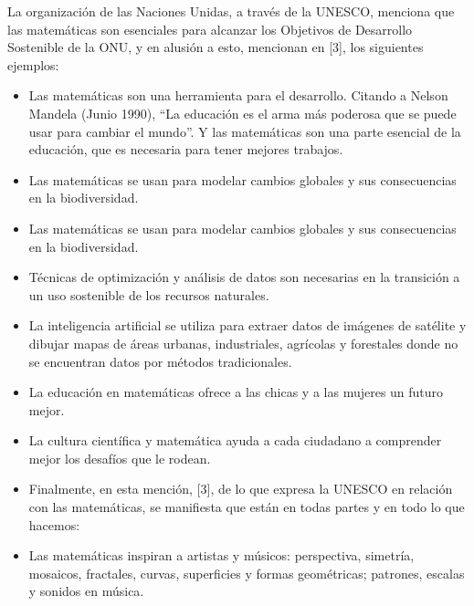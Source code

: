 La organización de las Naciones Unidas, a través de la UNESCO, menciona que las matemáticas son esenciales para alcanzar los Objetivos de Desarrollo Sostenible de la ONU, y en alusión a esto, mencionan en [3], los siguientes ejemplos: 

\begin{itemize}
    
     \color{blue} \item \color{black} Las matemáticas son una herramienta para el desarrollo. Citando a Nelson Mandela (Junio 1990), “La educación es el arma más poderosa que se puede usar para cambiar el mundo”. Y las matemáticas son una parte esencial de la educación, que es necesaria para tener mejores trabajos. 
    
    \color{blue} \item \color{black} Las matemáticas se usan para modelar cambios globales y sus consecuencias en la biodiversidad.
    
    \color{blue} \item \color{black} Las matemáticas se usan para modelar cambios globales y sus consecuencias en la biodiversidad.
    
    \color{blue} \item \color{black} Técnicas de optimización y análisis de datos son necesarias en la transición a un uso sostenible de los recursos naturales.
    
    \color{blue} \item \color{black} La inteligencia artificial se utiliza para extraer datos de imágenes de satélite y dibujar mapas de áreas urbanas, industriales, agrícolas y forestales donde no se encuentran datos por métodos tradicionales.   

    \color{blue} \item \color{black} La educación en matemáticas ofrece a las chicas y a las mujeres un futuro mejor.   

    \color{blue} \item \color{black} La cultura científica y matemática ayuda a cada ciudadano a comprender mejor los desafíos que le rodean. 
    
     \color{blue} \item \color{black} Finalmente, en esta mención, [3], de lo que expresa la UNESCO en relación con las matemáticas, se manifiesta que están en todas partes y en todo lo que hacemos: 
    
     \color{blue} \item \color{black} Las matemáticas inspiran a artistas y músicos: perspectiva, simetría, mosaicos, fractales, curvas, superficies y formas geométricas; patrones, escalas y sonidos en música. 
      

\end{itemize}
